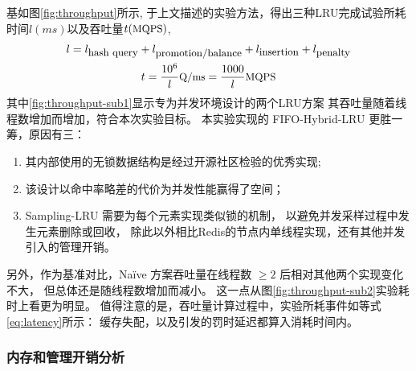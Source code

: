 基如图\ref{fig:throughput}所示, 于上文描述的实验方法，得出三种LRU完成试验所耗时间$l(ms)$以及吞吐量$t(\mbox{\small MQPS})$, 
\begin{gather}
    l = l_{\mbox{\small hash query}} + l_{\mbox{\small promotion/balance}} + l_{\mbox{\small insertion}} + l_{\mbox{\small penalty}} \label{eq:latency}\\
    t = \frac{10^6}{l} \mbox{\small Q/ms} = \frac{1000}{l} \mbox{\small MQPS}
\end{gather}
其中\ref{fig:throughput-sub1}显示专为并发环境设计的两个LRU方案
其吞吐量随着线程数增加而增加，符合本次实验目标。
本实验实现的 FIFO-Hybrid-LRU 更胜一筹，原因有三：
\begin{enumerate}
    \item 其内部使用的无锁数据结构是经过开源社区检验的优秀实现;
    \item 该设计以命中率略差的代价为并发性能赢得了空间；
    \item Sampling-LRU 需要为每个元素实现类似锁的机制，
        以避免并发采样过程中发生元素删除或回收，
        除此以外相比Redis的节点内单线程实现，还有其他并发引入的管理开销。
\end{enumerate}
另外，作为基准对比，Na\"{i}ve 方案吞吐量在线程数 $\geq 2$ 后相对其他两个实现变化不大，
但总体还是随线程数增加而减小。
这一点从图\ref{fig:throughput-sub2}实验耗时上看更为明显。
值得注意的是，吞吐量计算过程中，实验所耗事件如等式\ref{eq:latency}所示： 
缓存失配，以及引发的罚时延迟都算入消耗时间内。

\subsubsection{内存和管理开销分析}


